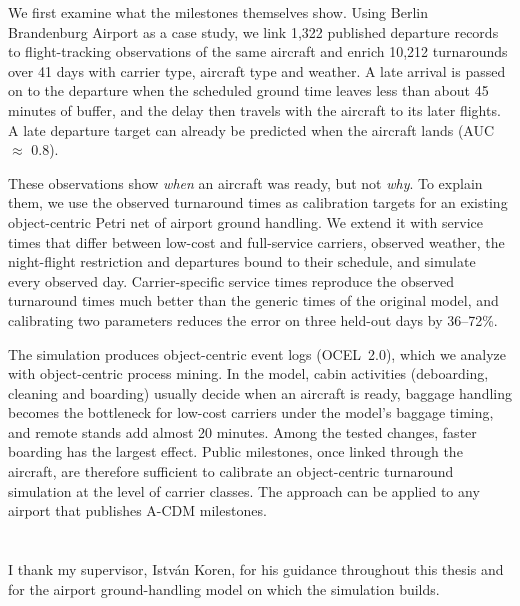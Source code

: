 \documentclass[
]{elteikthesis}[2024/04/26]
\begin{document}
We first examine what the milestones themselves show. Using Berlin Brandenburg Airport as a case study, we link 1,322 published departure records to flight-tracking observations of the same aircraft and enrich 10,212 turnarounds over 41 days with carrier type, aircraft type and weather. A late arrival is passed on to the departure when the scheduled ground time leaves less than about 45 minutes of buffer, and the delay then travels with the aircraft to its later flights. A late departure target can already be predicted when the aircraft lands (AUC $\approx$ 0.8).

These observations show \emph{when} an aircraft was ready, but not \emph{why}. To explain them, we use the observed turnaround times as calibration targets for an existing object-centric Petri net of airport ground handling. We extend it with service times that differ between low-cost and full-service carriers, observed weather, the night-flight restriction and departures bound to their schedule, and simulate every observed day. Carrier-specific service times reproduce the observed turnaround times much better than the generic times of the original model, and calibrating two parameters reduces the error on three held-out days by 36--72\%.

The simulation produces object-centric event logs (OCEL~2.0), which we analyze with object-centric process mining. In the model, cabin activities (deboarding, cleaning and boarding) usually decide when an aircraft is ready, baggage handling becomes the bottleneck for low-cost carriers under the model's baggage timing, and remote stands add almost 20 minutes. Among the tested changes, faster boarding has the largest effect. Public milestones, once linked through the aircraft, are therefore sufficient to calibrate an object-centric turnaround simulation at the level of carrier classes. The approach can be applied to any airport that publishes A-CDM milestones.
\cleardoublepage
\tableofcontents
\cleardoublepage

\cleardoublepage

\cleardoublepage

\cleardoublepage

\cleardoublepage

\cleardoublepage

\cleardoublepage

\cleardoublepage

\cleardoublepage
\chapter*{\acklabel}
I thank my supervisor, Istv\'an Koren, for his guidance throughout this thesis and for the airport ground-handling model on which the simulation builds.
\cleardoublepage
\appendix

\cleardoublepage

\cleardoublepage
{}
{}
\printbibliography[title=\biblabel]
\cleardoublepage
\listoffigures
\cleardoublepage
\listoftables
\end{document}
